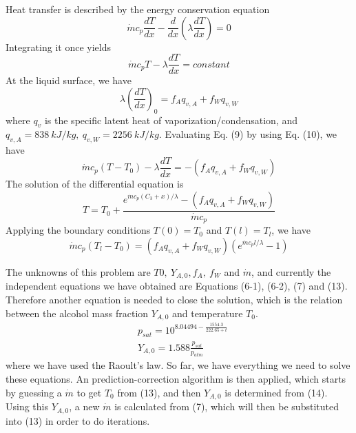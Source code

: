 \documentclass{article}
\begin{document}
Heat transfer is described by the energy conservation equation
\begin{equation}
    \dot{m} c_p \frac{dT}{dx} - \frac{d}{dx}(\lambda \frac{dT}{dx}) =0
\end{equation}
Integrating it once yields
\begin{equation}
    \dot{m} c_p T - \lambda \frac{dT}{dx} = constant
\end{equation}
At the liquid surface, we have
\begin{equation}
    \lambda (\frac{dT}{dx})_0=f_Aq_{v,A}+f_Wq_{v,W}
\end{equation}
where $q_{v}$ is the specific latent heat of vaporization/condensation, and  $q_{v,A}=838\ kJ/kg,\ q_{v,W}=2256\ kJ/kg$. Evaluating Eq. (9) by using Eq. (10), we have
\begin{equation}
    \dot{m}c_p(T-T_0) -\lambda \frac{dT}{dx} = -(f_Aq_{v,A}+f_Wq_{v,W}) 
\end{equation}
The solution of the differential equation is
\begin{equation}
    T=T_0 + \frac{e^{\dot{m} c_p (C_3 + x)/\lambda}-(f_A q_{v,A}+f_W q_{v,W})}{\dot{m} c_p}
\end{equation}
Applying the boundary conditions $T(0)=T_0$ and $T(l)=T_l$, we have
\begin{equation}
    \dot{m} c_p(T_l-T_0)=(f_A q_{v,A}+f_W q_{v,W})(e^{\dot{m} c_p l/\lambda}-1)
\end{equation}

The unknowns of this problem are $T0,\ Y_{A,0}, f_A,\ f_W$ and $\dot{m}$, and currently the independent equations we have obtained are Equations (6-1), (6-2), (7) and (13). Therefore another equation is needed to close the solution, which is the relation between the alcohol mass fraction $Y_{A,0}$ and temperature $T_0$.
\begin{equation}
\begin{aligned}
    & p_{sat} = 10^{8.04494-\frac{1554.3}{222.65+t}} \\
    & Y_{A,0} = 1.588\frac{p_{sat}}{p_{atm}}
\end{aligned}
\end{equation}
where we have used the Raoult's law. So far, we have everything we need to solve these equations. An prediction-correction algorithm is then applied, which starts by guessing a $\dot{m}$ to get $T_0$ from (13), and then $Y_{A,0}$ is determined from (14). Using this $Y_{A,0}$, a new $\dot{m}$ is calculated from (7), which will then be substituted into (13) in order to do iterations.
\end{document}
